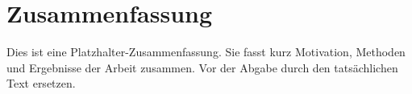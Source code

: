 \chapter*{Zusammenfassung}

Dies ist eine Platzhalter-Zusammenfassung.
Sie fasst kurz Motivation, Methoden und Ergebnisse der Arbeit zusammen.
Vor der Abgabe durch den tats\"achlichen Text ersetzen.

\cleardoublepage
